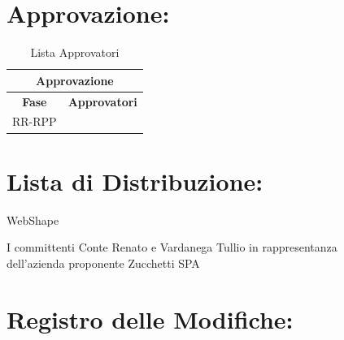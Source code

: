 \newpage	
	
\section*{\LARGE Approvazione:}
\begin{table}[!h]
	\begin{center}
		\begin{tabular}
			{|c|c|}
			\hline
			\multicolumn{2}{|c|}{ \textbf{Approvazione} } \\
			\hline
			\textbf{Fase} & \textbf{Approvatori} \\
			\hline
			\multirow{2}{*}{RR-RPP} & \\
									& \\
			\hline
		\end{tabular}
		\caption{Lista Approvatori} %
		\label{tabapprovazione}
	\end{center}
\end{table}

\textbf{}

\section*{\LARGE Lista di Distribuzione:}

	\begin{elenconumerato}{\normindent}
		\item WebShape 
		\item I committenti Conte Renato e Vardanega Tullio in rappresentanza \\  dell'azienda proponente Zucchetti SPA
	\end{elenconumerato}

\newpage



\section*{\Large Registro delle Modifiche:}


